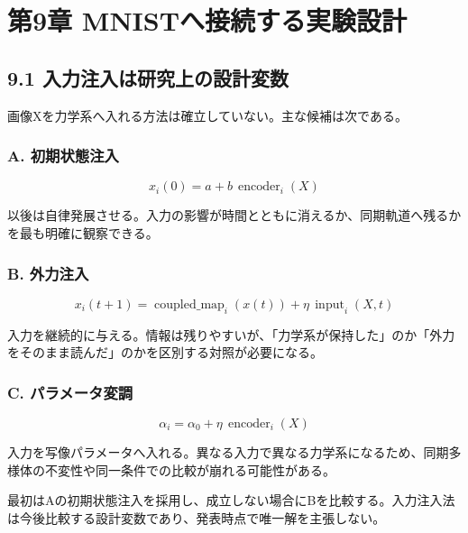 \documentclass[11pt,a4paper]{ltjsarticle}
\begin{document}
\goodbreak

\section*{\textcolor{researchink}{第9章 MNISTへ接続する実験設計}}


\subsection*{\textcolor{researchblue}{9.1 入力注入は研究上の設計変数}}

画像Xを力学系へ入れる方法は確立していない。主な候補は次である。\par

\subsubsection*{\textcolor{researchteal}{A. 初期状態注入}}

\[
x_i(0)=a+b\,\operatorname{encoder}_i(X)
\]

以後は自律発展させる。入力の影響が時間とともに消えるか、同期軌道へ残るかを最も明確に観察できる。\par

\subsubsection*{\textcolor{researchteal}{B. 外力注入}}

\[
x_i(t+1)=\operatorname{coupled\_map}_i\!\left(x(t)\right)+\eta\,\operatorname{input}_i(X,t)
\]

入力を継続的に与える。情報は残りやすいが、「力学系が保持した」のか「外力をそのまま読んだ」のかを区別する対照が必要になる。\par

\subsubsection*{\textcolor{researchteal}{C. パラメータ変調}}

\[
\alpha_i=\alpha_0+\eta\,\operatorname{encoder}_i(X)
\]

入力を写像パラメータへ入れる。異なる入力で異なる力学系になるため、同期多様体の不変性や同一条件での比較が崩れる可能性がある。\par

最初はAの初期状態注入を採用し、成立しない場合にBを比較する。入力注入法は今後比較する設計変数であり、発表時点で唯一解を主張しない。\par
\end{document}
